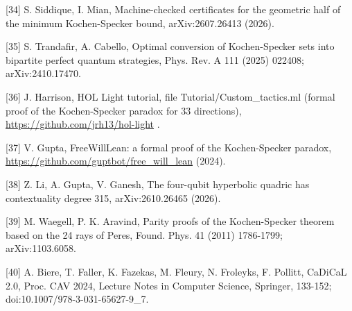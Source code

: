 \documentclass[11pt,a4paper]{article}
\begin{document}
{[}34{]} S. Siddique, I. Mian, Machine-checked certificates for the geometric half of the minimum Kochen-Specker bound, arXiv:2607.26413 (2026).

{[}35{]} S. Trandafir, A. Cabello, Optimal conversion of Kochen-Specker sets into bipartite perfect quantum strategies, Phys. Rev. A 111 (2025) 022408; arXiv:2410.17470.

{[}36{]} J. Harrison, HOL Light tutorial, file Tutorial/Custom\_tactics.ml (formal proof of the Kochen-Specker paradox for 33 directions), \url{https://github.com/jrh13/hol-light} .

{[}37{]} V. Gupta, FreeWillLean: a formal proof of the Kochen-Specker paradox, \url{https://github.com/guptbot/free_will_lean} (2024).

{[}38{]} Z. Li, A. Gupta, V. Ganesh, The four-qubit hyperbolic quadric has contextuality degree 315, arXiv:2610.26465 (2026).

{[}39{]} M. Waegell, P. K. Aravind, Parity proofs of the Kochen-Specker theorem based on the 24 rays of Peres, Found. Phys. 41 (2011) 1786-1799; arXiv:1103.6058.

{[}40{]} A. Biere, T. Faller, K. Fazekas, M. Fleury, N. Froleyks, F. Pollitt, CaDiCaL 2.0, Proc. CAV 2024, Lecture Notes in Computer Science, Springer, 133-152; doi:10.1007/978-3-031-65627-9\_7.
\end{document}
